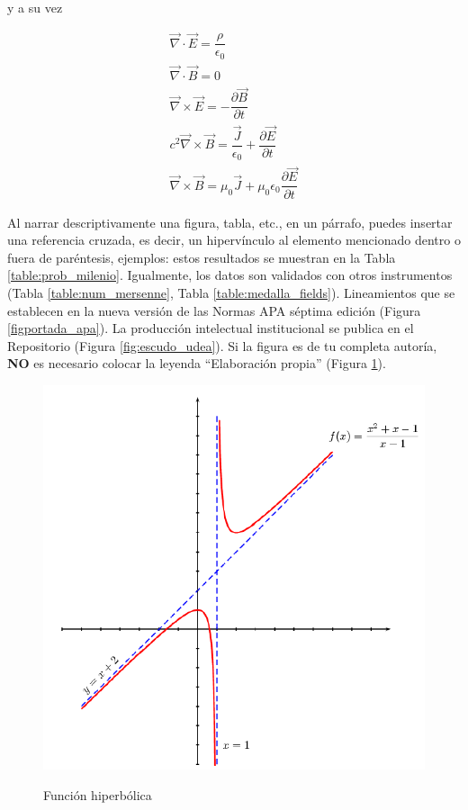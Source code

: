 y a su vez

\begin{gather}
    \vec{\nabla}\cdot \vec{E}= \dfrac{\rho}{\epsilon_0}\\
    \vec{\nabla}\cdot \vec{B}= 0\\
    \vec{\nabla}\times\vec{E}=-\dfrac{\partial\vec{B}}{\partial t}\\
    c^2\vec{\nabla}\times\vec{B} =\dfrac{\vec{J}}{\epsilon_0}+\dfrac{\partial
\vec{E}}{\partial t}\\
    \vec{\nabla}\times \vec{B}=\mu_0\vec{J}+\mu_0 \epsilon_0 \dfrac{\partial \vec{E}}{\partial t}
\end{gather}

 Al narrar descriptivamente una figura, tabla, etc., en un párrafo, puedes insertar una referencia cruzada, es decir, un hipervínculo al elemento mencionado dentro o fuera de paréntesis, ejemplos: estos resultados se muestran en la Tabla \ref{table:prob_milenio}.  Igualmente, los datos son validados con otros instrumentos (Tabla \ref{table:num_mersenne}, Tabla \ref{table:medalla_fields}). Lineamientos que se establecen en la nueva versión de las Normas APA séptima edición (Figura \ref{figportada_apa}). La producción intelectual institucional se publica en el Repositorio (Figura \ref{fig:escudo_udea}). Si la figura es de tu completa autoría, \textbf{NO} es necesario colocar la leyenda “Elaboración propia” (Figura \ref{fig:hiperbolica}).

\begin{figure}[!ht]
\caption{Función hiperbólica}
    \begin{center}
    \includegraphics[scale=0.5]{imagenes/grafica.png}\\
    \label{fig:hiperbolica}
    \end{center}
    \textit{}
\end{figure}

